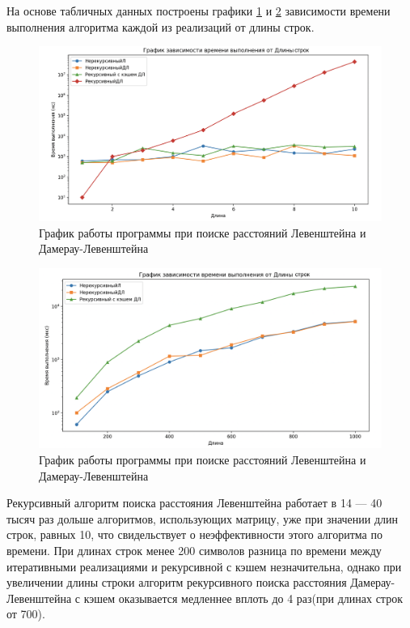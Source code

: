 На основе табличных данных построены графики \ref{img:demonstration} и
\ref{img:demonstr} зависимости времени 
выполнения алгоритма каждой из реализаций от длины строк. 

\begin{figure}[h]
	\centering
	\includegraphics[width=1\textwidth]{img/graph15.png}
	\caption{График работы программы при поиске расстояний Левенштейна и Дамерау-Левенштейна}
	\label{img:demonstration}
\end{figure}

\begin{figure}[h]
	\centering
	\includegraphics[width=1\textwidth]{img/allGraph.png}
	\caption{График работы программы при поиске расстояний Левенштейна и Дамерау-Левенштейна}
	\label{img:demonstr}
\end{figure}

\clearpage

Рекурсивный алгоритм поиска расстояния Левенштейна работает в 14 --- 40 
тысяч раз дольше алгоритмов, использующих матрицу, уже при значении 
длин строк, равных 10, что свидельствует о неэффективности этого алгоритма по времени. 
При длинах строк менее 200 символов разница по времени между 
итеративными реализациями и рекурсивной с кэшем незначительна, 
однако при увеличении 
длины строки алгоритм рекурсивного поиска расстояния Дамерау-Левенштейна с кэшем 
оказывается медленнее вплоть до 4 раз(при длинах строк от 700). 


